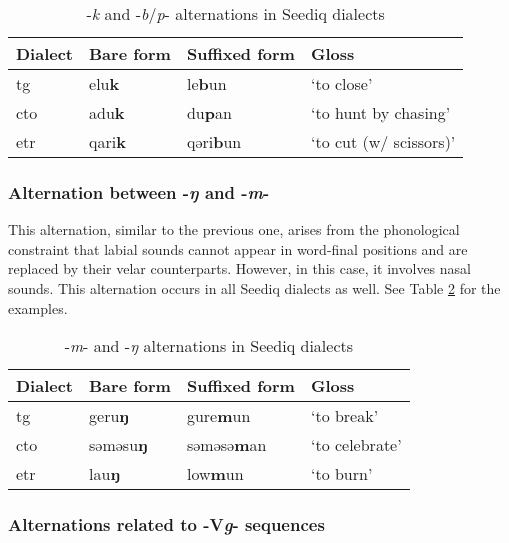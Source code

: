 \begin{table}[]
\centering
\caption{-\textit{k} and -\textit{b}/\textit{p}- alternations in Seediq dialects}
\label{tab:bpk_alt}
\begin{tabular}{llll}
\hline
Dialect   & Bare form & Suffixed form & Gloss                  \\ \hline
\acl{tg}  & elu\textbf{k}      & le\textbf{b}un         & `to close'             \\
\acl{cto} & adu\textbf{k}      & du\textbf{p}an         & `to hunt by chasing'   \\
\acl{etr} & qari\textbf{k}     & qəri\textbf{b}un       & `to cut (w/ scissors)' \\ \hline
\end{tabular}
\end{table}

\subsubsection{Alternation between -\textit{ŋ} and -\textit{m}-}

This alternation, similar to the previous one, arises from the phonological constraint that labial sounds cannot appear in word-final positions and are replaced by their velar counterparts. However, in this case, it involves nasal sounds. This alternation occurs in all Seediq dialects as well. See Table \ref{tab:mng_alt} for the examples. 

\begin{table}[!htbp]
\centering
\caption{-\textit{m}- and -\textit{ŋ} alternations in Seediq dialects}
\label{tab:mng_alt}
\begin{tabular}{llll}
\hline
Dialect   & Bare form & Suffixed form & Gloss          \\ \hline
\acl{tg}  & geru\textbf{ŋ}     & gure\textbf{m}un       & `to break'     \\
\acl{cto} & səməsu\textbf{ŋ}   & səməsə\textbf{m}an     & `to celebrate' \\
\acl{etr} & lau\textbf{ŋ}      & low\textbf{m}un        & `to burn'      \\ \hline
\end{tabular}
\end{table}

\subsubsection{Alternations related to -V\textit{g}- sequences} \label{sec:Vg_alt}

